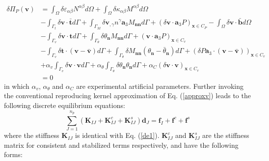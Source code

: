 \begin{equation}
\begin{split}
\delta \Pi_P(\boldsymbol v) &= \int_\Omega\delta \varepsilon_{\alpha\beta} N^{\alpha\beta} d\Omega +
\int_\Omega \delta \kappa_{\alpha\beta}M^{\alpha\beta} d\Omega \\
                     &- \int_{\Gamma_t} \delta \boldsymbol v \cdot \bar{\boldsymbol t} d\Gamma 
                     + \int_{\Gamma_M} \delta \boldsymbol v_{,\gamma} n^\gamma \boldsymbol a_3 M_{\boldsymbol{nn}} d\Gamma
                     + (\delta \boldsymbol v \cdot \boldsymbol a_3 P)_{\boldsymbol x \in C_P}
                     - \int_\Omega \delta \boldsymbol v \cdot \bar{\boldsymbol b} d\Omega \\
                     &- \int_{\Gamma_v} \delta \boldsymbol v \cdot \boldsymbol t d\Gamma 
                     + \int_{\Gamma_\theta} \delta \theta_{\boldsymbol n} M_{\boldsymbol{nn}}d\Gamma 
                     + (\boldsymbol v \cdot \boldsymbol a_3 P)_{\boldsymbol x \in C_v}\\
                     &- \int_{\Gamma_v} \delta \boldsymbol t \cdot (\boldsymbol v - \bar{\boldsymbol v}) d\Gamma
                     + \int_{\Gamma_\theta} \delta M_{\boldsymbol{nn}}(\theta_{\boldsymbol n} - \bar \theta_{\boldsymbol n})d\Gamma
                     + (\delta P\boldsymbol a_3 \cdot (\boldsymbol v - \bar{\boldsymbol v}))_{\boldsymbol x \in C_v} \\
                     &+ \alpha_v \int_{\Gamma_v} \delta \boldsymbol v \cdot \boldsymbol v d\Gamma 
                     + \alpha_\theta \int_{\Gamma_\theta} \delta \theta_{\boldsymbol n}\theta_{\boldsymbol n} d\Gamma
                     + \alpha_C(\delta \boldsymbol v \cdot \boldsymbol v)_{\boldsymbol x\in C_v} \\
                     &= 0
\end{split}
\end{equation}
in which $\alpha_v$, $\alpha_\theta$ and $\alpha_C$ are experimental artificial parameters. Further invoking the conventional reproducing kernel approximation of Eq. (\ref{approxv}) leads to the following discrete equilibrium equations:
\begin{equation}
\sum_{J=1}^{n_p}(\boldsymbol K_{IJ} + \boldsymbol K^c_{IJ} + \boldsymbol K^s_{IJ}) \boldsymbol d_J = \boldsymbol f_I + \boldsymbol f^c + \boldsymbol f^s
\end{equation}
where the stiffness $\boldsymbol K_{IJ}$ is identical with Eq. (\ref{de1}). $\boldsymbol K^c_{IJ}$ and $\boldsymbol K^s_{IJ}$ are the stiffness matrix for consistent and stabilized terms respectively, and have the following forms:
